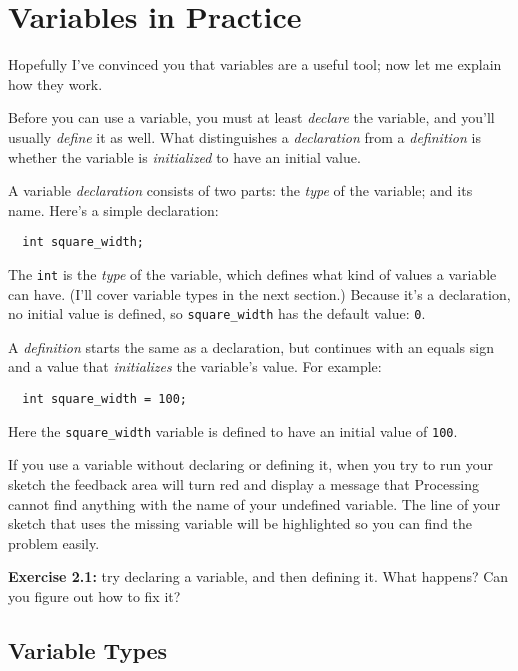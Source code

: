 \documentclass[
]{leaflet}
\begin{document}
\section{Variables in Practice}

Hopefully I've convinced you that variables are a useful tool; now let me explain how they work.

Before you can use a variable, you must at least \textit{declare} the variable, and you'll usually \textit{define} it as well.
What distinguishes a \textit{declaration} from a \textit{definition} is whether the variable is \textit{initialized} to have an initial value.

A variable \textit{declaration} consists of two parts: the \textit{type} of the variable; and its name.
Here's a simple declaration:
\begin{lstlisting}
  int square_width;
\end{lstlisting}
\vspace{-0.5em}
The \texttt{int} is the \textit{type} of the variable, which defines what kind of values a variable can have.
(I'll cover variable types in the next section.)
Because it's a declaration, no initial value is defined, so \texttt{square\_width} has the default value:  \texttt{0}.

A \textit{definition} starts the same as a declaration, but continues with an equals sign and a value that \textit{initializes} the variable's value.
For example:
\begin{lstlisting}
  int square_width = 100;
\end{lstlisting}
\vspace{-0.5em}
Here the \texttt{square\_width} variable is defined to have an initial value of \texttt{100}.

If you use a variable without declaring or defining it, when you try to run your sketch the feedback area will turn red and display a message that Processing cannot find anything with the name of your undefined variable.
The line of your sketch that uses the missing variable will be highlighted so you can find the problem easily.

\textbf{Exercise 2.1:} try declaring a variable, and then defining it. What happens? Can you figure out how to fix it?

\subsection{Variable Types}
\end{document}
